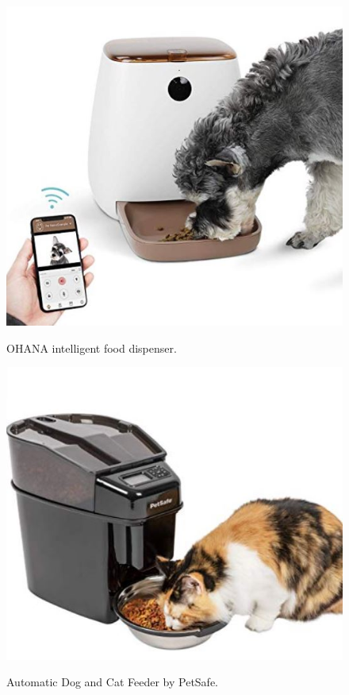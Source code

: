 \documentclass[twocolumn]{webofc}
\begin{document}
\begin{figure}
  \centering
  \includegraphics[width=\columnwidth]{OHANA.JPG}
  \caption{OHANA intelligent food dispenser.}\label{fig:ohana}\cite{ohana_dispenser}
\end{figure}
\begin{figure}
  \centering
  \includegraphics[width=\columnwidth]{petsafe.JPG}
  \caption{Automatic Dog and Cat Feeder by PetSafe.}\label{fig:petsafe}\cite{pet_safe}
\end{figure}
\end{document}
